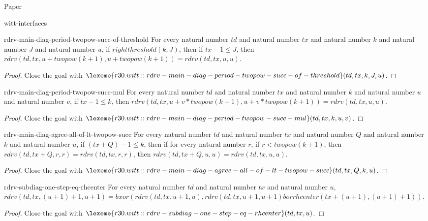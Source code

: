 \begin{lexlean}{Paper}
\begin{section}{witt-interfaces}
  \begin{theorem}{rdrv-main-diag-period-twopow-succ-of-threshold}
  For every natural number \(td\) and natural number \(tx\) and natural number \(k\) and natural number \(J\) and natural number \(u\), if \(rightthreshold(k, J)\), then if \(tx - 1 ≤ J\), then \(rdrv(td, tx, u + twopow(k + 1), u + twopow(k + 1)) = rdrv(td, tx, u, u)\).
  \begin{proof}
  Close the goal with \(\lexeme{r30.witt::rdrv-main-diag-period-twopow-succ-of-threshold}(td, tx, k, J, u)\).
  \end{proof}
  \end{theorem}

  \begin{theorem}{rdrv-main-diag-period-twopow-succ-mul}
  For every natural number \(td\) and natural number \(tx\) and natural number \(k\) and natural number \(u\) and natural number \(v\), if \(tx - 1 ≤ k\), then \(rdrv(td, tx, u + v * twopow(k + 1), u + v * twopow(k + 1)) = rdrv(td, tx, u, u)\).
  \begin{proof}
  Close the goal with \(\lexeme{r30.witt::rdrv-main-diag-period-twopow-succ-mul}(td, tx, k, u, v)\).
  \end{proof}
  \end{theorem}

  \begin{theorem}{rdrv-main-diag-agree-all-of-lt-twopow-succ}
  For every natural number \(td\) and natural number \(tx\) and natural number \(Q\) and natural number \(k\) and natural number \(u\), if \((tx + Q) - 1 ≤ k\), then if for every natural number \(r\), if \(r < twopow(k + 1)\), then \(rdrv(td, tx + Q, r, r) = rdrv(td, tx, r, r)\), then \(rdrv(td, tx + Q, u, u) = rdrv(td, tx, u, u)\).
  \begin{proof}
  Close the goal with \(\lexeme{r30.witt::rdrv-main-diag-agree-all-of-lt-twopow-succ}(td, tx, Q, k, u)\).
  \end{proof}
  \end{theorem}

  \begin{theorem}{rdrv-subdiag-one-step-eq-rhcenter}
  For every natural number \(td\) and natural number \(tx\) and natural number \(u\), \(rdrv(td, tx, (u + 1) + 1, u + 1) = bxor(rdrv(td, tx, u + 1, u), rdrv(td, tx, u + 1, u + 1) bor rhcenter(tx + (u + 1), (u + 1) + 1))\).
  \begin{proof}
  Close the goal with \(\lexeme{r30.witt::rdrv-subdiag-one-step-eq-rhcenter}(td, tx, u)\).
  \end{proof}
  \end{theorem}


\end{section}
\end{lexlean}
